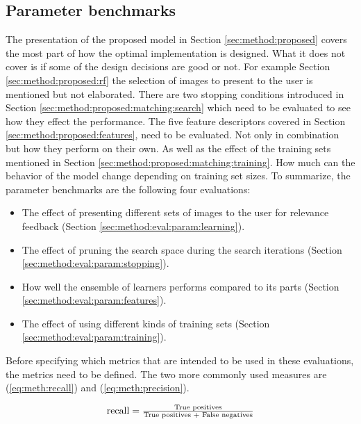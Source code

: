 \subsection{Parameter benchmarks}
\label{sec:method:eval:param}
The presentation of the proposed model in Section \ref{sec:method:proposed} covers the most part of how the optimal implementation is designed. What it does not cover is if some of the design decisions are good or not. For example Section \ref{sec:method:proposed:rf} the selection of images to present to the user is mentioned but not elaborated. There are two stopping conditions introduced in Section \ref{sec:method:proposed:matching:search} which need to be evaluated to see how they effect the performance. The five feature descriptors covered in Section \ref{sec:method:proposed:features}, need to be evaluated. Not only in combination but how they perform on their own.
As well as the effect of the training sets mentioned in Section \ref{sec:method:proposed:matching:training}. How much can the behavior of the model change depending on training set sizes.
To summarize, the parameter benchmarks are the following four evaluations:
\begin{itemize}
\item The effect of presenting different sets of images to the user for relevance feedback (Section \ref{sec:method:eval:param:learning}).
\item The effect of pruning the search space during the search iterations (Section \ref{sec:method:eval:param:stopping}).
\item How well the ensemble of learners performs compared to its parts (Section \ref{sec:method:eval:param:features}).
\item The effect of using different kinds of training sets (Section \ref{sec:method:eval:param:training}).
\end{itemize}
\medskip

Before specifying which metrics that are intended to be used in these evaluations, the metrics need to be defined. The two more commonly used measures are (\ref{eq:meth:recall}) and (\ref{eq:meth:precision}).

\begin{equation}
\label{eq:meth:recall}
\textnormal{recall} = \tfrac{\textnormal{True positives}}{\textnormal{True positives } + \textnormal{ False negatives}}
\end{equation}

